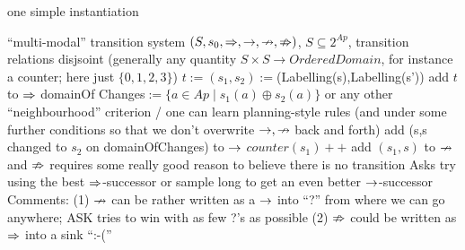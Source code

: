 \documentclass{article}
\begin{document}
\begin{algorithm}
	\caption{one simple instantiation}\label{alg:learn}
	\begin{algorithmic}[1]
		\Require ``multi-modal'' transition system $(S,s_0,\Rightarrow,\rightarrow,\nrightarrow,\nRightarrow)$, $S\subseteq 2^{Ap}$, transition relations disjsoint (generally any quantity $S\times S\to \mathit{OrderedDomain}$, for instance a counter; here just $\{0,1,2,3\}$)
		\State $t:=(s_1,s_2):=$(Labelling(s),Labelling(s'))
		\State add $t$ to $\Rightarrow$
		\State domainOf Changes$:=\{a\in Ap\mid s_1(a)\oplus s_2(a)\}$
		\State \Comment or any other ``neighbourhood'' criterion / one can learn planning-style rules
		\State \Comment(and under some further conditions so that we don't overwrite $\rightarrow,\nrightarrow$ back and forth)
		\State add (s,s changed to $s_2$ on domainOfChanges) to $\rightarrow$
		\EndFor
		\EndIf
		\State $counter(s_1)++$
		\State add $(s_1,s)$ to $\nrightarrow$
		\EndFor
		\EndIf
		\EndProcedure
		\State\Comment and $\nRightarrow$ requires some really good reason to believe there is no transition
		\Procedure Ask{s}
		\State try using the best $\Rightarrow$-successor or sample long to get an even better $\rightarrow$-successor
		\EndProcedure
		\newline
		\State Comments: 
		\State (1) $\nrightarrow$ can be rather written as a $\rightarrow$ into ``?'' from where we can go anywhere; ASK tries to win with as few ?'s as possible
		\State (2) $\nRightarrow$ could be written as $\Rightarrow$ into a sink ``:-(''
	\end{algorithmic}
\end{algorithm}
\end{document}
